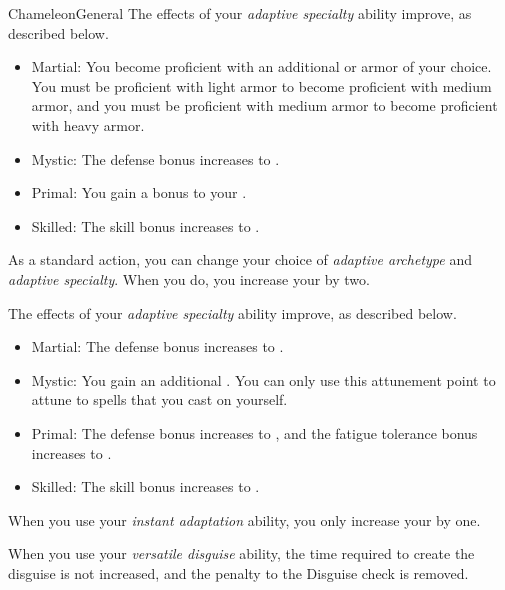 \begin{feat}{Chameleon}{General}
         The effects of your \textit{adaptive specialty} ability improve, as described below.
        \begin{itemize}
            \item Martial: You become proficient with an additional  or armor  of your choice.
                You must be proficient with light armor to become proficient with medium armor, and you must be proficient with medium armor to become proficient with heavy armor.
            \item Mystic: The defense bonus increases to .
            \item Primal: You gain a  bonus to your .
            \item Skilled: The skill bonus increases to .
        \end{itemize}

         As a standard action, you can change your choice of \textit{adaptive archetype} and \textit{adaptive specialty}.
        When you do, you increase your  by two.

         The effects of your \textit{adaptive specialty} ability improve, as described below.
        \begin{itemize}
            \item Martial: The defense bonus increases to .
            \item Mystic: You gain an additional .
                You can only use this attunement point to attune to spells that you cast on yourself.
            \item Primal: The defense bonus increases to , and the fatigue tolerance bonus increases to .
            \item Skilled: The skill bonus increases to .
        \end{itemize}

         When you use your \textit{instant adaptation} ability,
        you only increase your  by one.

         When you use your \textit{versatile disguise} ability, the time required to create the disguise is not increased, and the penalty to the Disguise check is removed.


\end{feat}
